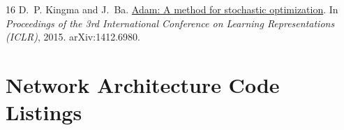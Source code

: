 \documentclass[11pt,a4paper]{article}
\begin{document}
\begin{thebibliography}{16}
D.~P. Kingma and J.~Ba.
\newblock \href{https://arxiv.org/pdf/1412.6980.pdf#page=2}{Adam: A method for stochastic optimization}.
\newblock In {\em Proceedings of the 3rd International Conference on Learning Representations (ICLR)}, 2015. arXiv:1412.6980. 

\end{thebibliography}

\newpage
\appendix

\section{Network Architecture Code Listings}
\label{sec:app_code}
\end{document}
